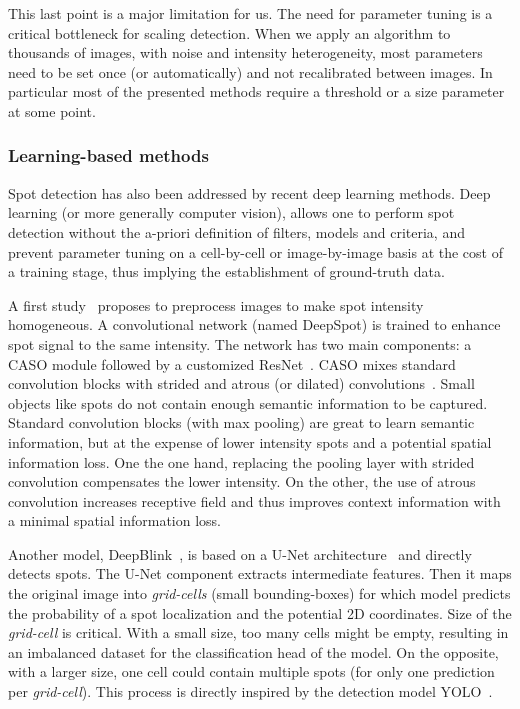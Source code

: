 This last point is a major limitation for us.
The need for parameter tuning is a critical bottleneck for scaling detection.
When we apply an algorithm to thousands of images, with noise and intensity heterogeneity, most parameters need to be set once (or automatically) and not recalibrated between images.
In particular most of the presented methods require a threshold or a size parameter at some point.


\subsubsection{Learning-based methods}

Spot detection has also been addressed by recent deep learning methods.
Deep learning (or more generally computer vision), allows one to perform spot detection without the a-priori definition of filters, models and criteria, and prevent parameter tuning on a cell-by-cell or image-by-image basis at the cost of a training stage, thus implying the establishment of ground-truth data.

A first study~\cite{bouilhol_deepspot_2022} proposes to preprocess images to make spot intensity homogeneous.
A convolutional network (named DeepSpot) is trained to enhance spot signal to the same intensity.
The network has two main components: a \ac{CASO} module followed by a customized ResNet~\cite{He_2016}.
\ac{CASO} mixes standard convolution blocks with strided and atrous (or dilated) convolutions~\cite{Hamaguchi_2018}.
Small objects like spots do not contain enough semantic information to be captured.
Standard convolution blocks (with max pooling) are great to learn semantic information, but at the expense of lower intensity spots and a potential spatial information loss.
One the one hand, replacing the pooling layer with strided convolution compensates the lower intensity.
On the other, the use of atrous convolution increases receptive field and thus improves context information with a minimal spatial information loss.

Another model, DeepBlink~\cite{eichenberger_deepblink_2021}, is based on a U-Net architecture~\cite{Ronneberger_2015} and directly detects spots.
The U-Net component extracts intermediate features.
Then it maps the original image into \emph{grid-cells} (small bounding-boxes) for which model predicts the probability of a spot localization and the potential 2D coordinates.
Size of the \emph{grid-cell} is critical.
With a small size, too many cells might be empty, resulting in an imbalanced dataset for the classification head of the model.
On the opposite, with a larger size, one cell could contain multiple spots (for only one prediction per \emph{grid-cell}).
This process is directly inspired by the detection model YOLO~\cite{Redmon_2016_CVPR}.

